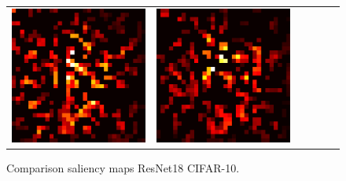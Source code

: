 \documentclass[preprint,12pt]{elsarticle}
\begin{document}
\begin{figure}[p]
\begin{tabular}{cccccc}
  \includegraphics[scale=\scale]{../visualizations/examples/cifar10/resnet18/active_saliency_map/9.png} & 
  \includegraphics[scale=\scale]{../visualizations/examples/cifar10/resnet18/inactive_saliency_map/9.png} \\
  \end{tabular}
  \caption{Comparison saliency maps ResNet18 CIFAR-10.}
\end{figure}
\end{document}
